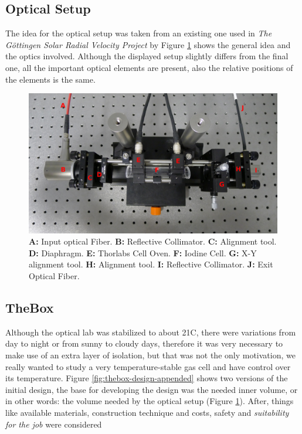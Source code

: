 \documentclass[master,       %
               twoside,        %
               BCOR10mm,       %
               ngerman,english  %
               ]{GAUBM_astro}
\begin{document}
\subsection{Optical Setup}
The idea for the optical setup was taken from an existing one used in \emph{The G\"ottingen Solar Radial Velocity Project}  by \cite{lemke2016} 
Figure \ref{fig:optical_setup} shows the general idea and the optics involved. Although the displayed setup slightly differs from the final one,
all the important optical elements are present, also the relative positions of the elements is the same.
\begin{figure}
 \centering
 \includegraphics[width=\columnwidth,keepaspectratio=true]{./img/optical_setup_idea.jpg}
 \caption{\textbf{A:} Input optical Fiber. \textbf{B:} Reflective Collimator.  \textbf{C:} Alignment tool. \textbf{D:} Diaphragm.  \textbf{E:} Thorlabs Cell Oven. \textbf{F:} Iodine Cell.  \textbf{G:} X-Y alignment tool. \textbf{H:} Alignment tool.  \textbf{I:} Reflective Collimator. \textbf{J:} Exit Optical Fiber.}
 \label{fig:optical_setup}
\end{figure}

\subsection{TheBox}
Although the optical lab was stabilized to about 21\textdegree C, there were variations
from day to night or from sunny to cloudy days, therefore it was very necessary to make use of an extra layer of isolation, but that was not the
only motivation, we really wanted to study a very temperature-stable gas cell and have control over its temperature. Figure \ref{fig:thebox-design-appended}
shows two versions of the initial design, the base for developing the design was the needed inner volume, or in other words: the volume needed by the optical 
setup (Figure \ref{fig:optical_setup}). After, things like available materials, construction technique and costs, safety and \emph{suitability for the job} 
were considered 
\end{document}
